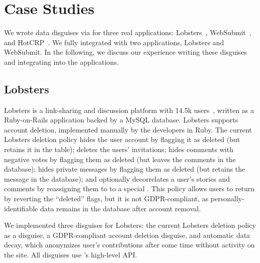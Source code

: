 \section{Case Studies}
\label{s:case-studies}

%
We wrote data disguises via \sys for three real applications:
Lobsters~\cite{lobsters},
WebSubmit~\cite{websubmit-rs-anon},
and HotCRP~\cite{hotcrp}.
%
We fully integrated \sys with two applications, Lobsters and WebSubmit.
%
In the following, we discuss our experience writing these disguises and integrating
\sys into the applications.
%

\subsection{Lobsters}

%
Lobsters is a link-sharing and discussion platform with 14.5k users~\cite{lobsters},
written as a Ruby-on-Rails application backed by a MySQL database.
%
Lobsters supports account deletion, implemented manually by the developers in Ruby.
%
The current Lobsters deletion policy
\one{} hides the user account by flagging it as deleted (but retains it in the  table);
\two{} deletes the users' invitations;
\three{} hides comments with negative votes by flagging them as deleted (but leaves
the comments in the database);
\four{} hides private messages by flagging them as deleted (but retains the message
in the database); and
\five{} optionally decorrelates a user's stories and comments by reassigning them to
to a special .
%
This policy allows users to return by reverting the ``deleted'' flags, but it is
not GDPR-compliant, as personally-identifiable data remains in the database after
account removal.
%

%
We implemented three disguises for Lobsters: the current Lobsters deletion
policy as a disguise, a GDPR-compliant account deletion disguise, and automatic data decay,
which anonymizes user's contributions after some time without activity on the site.
%
All disguises use \sys's high-level API.
%

